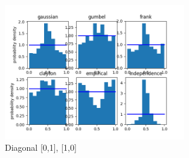 \begin{figure}[h]
	\centering
	\includegraphics[width=0.7\textwidth]{test_more_h/2015-01-02_12_00-2015-01-02_13_00-1.png}
	\caption{Diagonal [0,1], [1,0]}
\end{figure}

